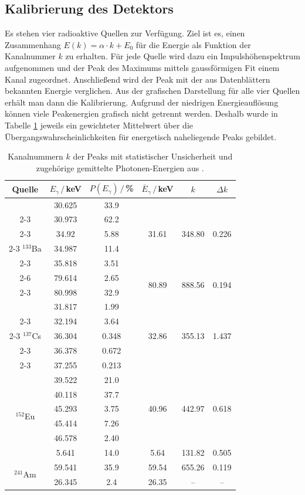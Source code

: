 \documentclass[german, parskip=full]{scrartcl}
\begin{document}
\subsection{Kalibrierung des Detektors}
Es stehen vier radioaktive Quellen zur Verfügung. Ziel ist es, einen Zusammenhang $E(k)=\alpha\cdot k+E_0$ für die Energie als Funktion der Kanalnummer $k$ zu erhalten. Für jede Quelle wird dazu ein Impulshöhenspektrum aufgenommen und der Peak des Maximums mittels gaussförmigen Fit einem Kanal zugeordnet. Anschließend wird der Peak mit der aus Datenblättern bekannten Energie verglichen. Aus der grafischen Darstellung für alle vier Quellen erhält man dann die Kalibrierung. Aufgrund der niedrigen Energieauflösung können viele Peakenergien grafisch nicht getrennt werden. Deshalb wurde in Tabelle \ref{table:kalibrierung} jeweils ein gewichteter Mittelwert über die Übergangswahrscheinlichkeiten für energetisch naheliegende Peaks gebildet.  
\begin{table}[!h]
\centering
\begin{tabular}{c|c|c|c|c|c}
Quelle&$E_\gamma\,/\,$keV&$P(E_\gamma)\,/\,$\%&$\overline{E}_\gamma\,/\,$keV&$k$&$\Delta k$\\ \hline
        &30.625 & 33.9&&&\\ \cline{2-3}
	    &30.973 & 62.2&&&\\ \cline{2-3}
        &34.92 	& 5.88&31.61&348.80&0.226\\ \cline{2-3}
${}^{133}$Ba&34.987 & 11.4&&&\\ \cline{2-3}
	    &35.818 	& 3.51&&&\\ \cline{2-6}
	    &79.614&2.65&\multirow{2}{*}{80.89}&\multirow{2}{*}{888.56}&\multirow{2}{*}{0.194} \\ \cline{2-3}
	    &80.998&32.9&&& \\ \hline
        &31.817 	& 1.99&&&\\ \cline{2-3}
	    &32.194 	& 3.64&&&\\ \cline{2-3}
${}^{137}$Cs&36.304 & 0.348&32.86&355.13&1.437\\ \cline{2-3}
	    &36.378 	& 0.672&&&\\ \cline{2-3}
	    &37.255 	& 0.213&&&\\ \hline
\multirow{6}{*}{${}^{152}$Eu}&39.522 &21.0&&& \\ \cline{2-3}
&40.118 &	     37.7&&&\\ \cline{2-3}
&45.293 &3.75 &40.96&442.97&0.618 \\ \cline{2-3}
&45.414 &	      7.26&&&\\ \cline{2-3}
&46.578 &	      2.40&&&\\ \cline{2-6}
&5.641 &14.0 &5.64&131.82&0.505\\ \hline
\multirow{2}{*}{${}^{241}$Am}&59.541 & 35.9 & 59.54 &655.26&0.119\\ \cline{2-6}
&26.345&2.4&26.35&--&-- \\ 
\end{tabular}
\caption{Kanalnummern $k$ der Peaks mit statistischer Unsicherheit und zugehörige gemittelte Photonen-Energien aus \cite{Radio Nuklid Info}.}
\label{table:kalibrierung}
\end{table}\\
\end{document}
